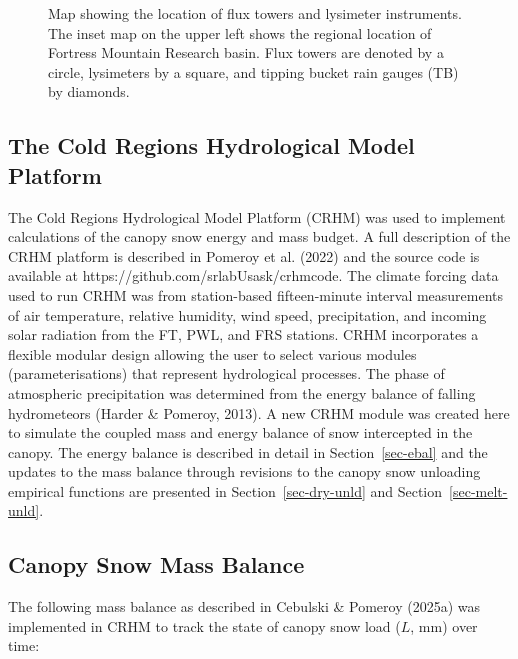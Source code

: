 \documentclass[
]{agujournal2019}
\makeatletter
\newcommand*\pandocbounded[1]{%
  \sbox\pandoc@box{#1}%
  \Gscale@div\@tempa{\textheight}{\dimexpr\ht\pandoc@box+\dp\pandoc@box\relax}%
  \Gscale@div\@tempb{\linewidth}{\wd\pandoc@box}%
  \ifdim\@tempb\p@<\@tempa\p@\let\@tempa\@tempb\fi%
  \ifdim\@tempa\p@<\p@\scalebox{\@tempa}{\usebox\pandoc@box}%
  \else\usebox{\pandoc@box}%
  \fi%
}
\makeatother
\begin{document}
\begin{figure}[htbp]

\centering{

\pandocbounded{\texttt{[image: figs/final/figure3.png]}}

}

\caption{\label{fig-site-map}Map showing the location of flux towers and
lysimeter instruments. The inset map on the upper left shows the
regional location of Fortress Mountain Research basin. Flux towers are
denoted by a circle, lysimeters by a square, and tipping bucket rain
gauges (TB) by diamonds.}

\end{figure}%

\subsection{The Cold Regions Hydrological Model
Platform}\label{the-cold-regions-hydrological-model-platform}

The Cold Regions Hydrological Model Platform (CRHM) was used to
implement calculations of the canopy snow energy and mass budget. A full
description of the CRHM platform is described in Pomeroy et al. (2022)
and the source code is available at
https://github.com/srlabUsask/crhmcode. The climate forcing data used to
run CRHM was from station-based fifteen-minute interval measurements of
air temperature, relative humidity, wind speed, precipitation, and
incoming solar radiation from the FT, PWL, and FRS stations. CRHM
incorporates a flexible modular design allowing the user to select
various modules (parameterisations) that represent hydrological
processes. The phase of atmospheric precipitation was determined from
the energy balance of falling hydrometeors (Harder \& Pomeroy, 2013). A
new CRHM module was created here to simulate the coupled mass and energy
balance of snow intercepted in the canopy. The energy balance is
described in detail in Section~\ref{sec-ebal} and the updates to the
mass balance through revisions to the canopy snow unloading empirical
functions are presented in Section~\ref{sec-dry-unld} and
Section~\ref{sec-melt-unld}.

\subsection{Canopy Snow Mass Balance}\label{sec-mbal}

The following mass balance as described in Cebulski \& Pomeroy (2025a)
was implemented in CRHM to track the state of canopy snow load (\(L\),
mm) over time:
\end{document}
